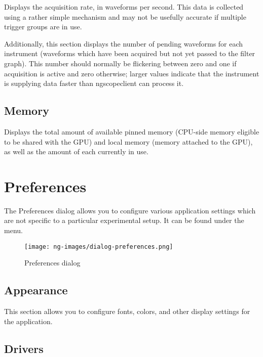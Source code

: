 Displays the acquisition rate, in waveforms per second. This data is collected using a rather simple mechanism and
may not be usefully accurate if multiple trigger groups are in use.

Additionally, this section displays the number of pending waveforms for each instrument (waveforms which have been
acquired but not yet passed to the filter graph). This number should normally be flickering between zero and one if
acquisition is active and zero otherwise; larger values indicate that the instrument is supplying data faster than
ngscopeclient can process it.

\subsection{Memory}

Displays the total amount of available pinned memory (CPU-side memory eligible to be shared with the GPU) and local
memory (memory attached to the GPU), as well as the amount of each currently in use.


\section{Preferences}
\label{dlg:preferences}

The Preferences dialog allows you to configure various application settings which are not specific to a particular
experimental setup. It can be found under the  menu.

\begin{figure}[H]
\centering
\texttt{[image: ng-images/dialog-preferences.png]}
\caption{Preferences dialog}
\label{prefs}
\end{figure}

\subsection{Appearance}

This section allows you to configure fonts, colors, and other display settings for the application.


\subsection{Drivers}

